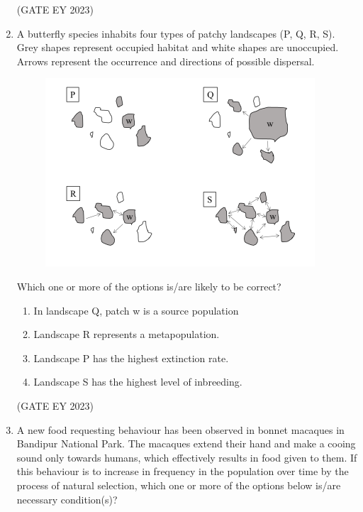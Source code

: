 \documentclass[journal,12pt,onecolumn]{IEEEtran}
\theoremstyle{remark}
\begin{document}
\begin{enumerate}
\hfill{(GATE EY 2023)}




 \item A butterfly species inhabits four types of patchy landscapes (P, Q, R, S). Grey
shapes represent occupied habitat and white shapes are unoccupied. Arrows
represent the occurrence and directions of possible dispersal. 

\begin{figure}[H]
    \centering
    \includegraphics[]{figs/Q.58.png}
    \caption{}
    \label{fig:}
\end{figure}
Which one or more of the options is/are likely to be correct?
\begin{enumerate}

\item In landscape Q, patch w is a source population
\item Landscape R represents a metapopulation.
\item Landscape P has the highest extinction rate.
\item Landscape S has the highest level of inbreeding.


\end{enumerate}

\hfill{(GATE EY 2023)}


 \item A new food requesting behaviour has been observed in bonnet macaques in
Bandipur National Park. The macaques extend their hand and make a cooing sound
only towards humans, which effectively results in food given to them. If this
behaviour is to increase in frequency in the population over time by the process of
natural selection, which one or more of the options below is/are necessary
condition(s)? 
\begin{enumerate}


\end{enumerate}
\end{enumerate}
\end{document}
